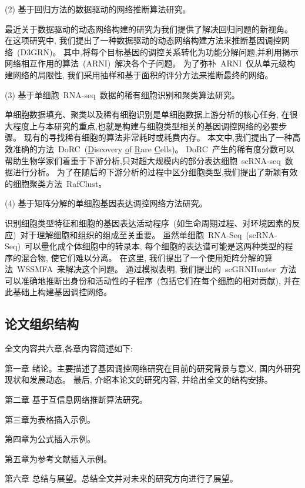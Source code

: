(2) 基于回归方法的数据驱动的网络推断算法研究。

最近关于数据驱动的动态网络构建的研究为我们提供了解决回归问题的新视角。
在这项研究中, 我们提出了一种数据驱动的动态网络构建方法来推断基因调控网络~(D3GRN)。
其中,将每个目标基因的调控关系转化为功能分解问题,并利用揭示网络相互作用的算法~(ARNI)~解决各个子问题。
为了弥补~ARNI~仅从单元级构建网络的局限性,
我们采用抽样和基于面积的评分方法来推断最终的网络。


(3) 基于单细胞~RNA-seq~数据的稀有细胞识别和聚类算法研究。

单细胞数据填充、聚类以及稀有细胞识别是单细胞数据上游分析的核心任务, 
在很大程度上与本研究的重点,也就是构建与细胞类型相关的基因调控网络的必要步骤。
现有的寻找稀有细胞的算法非常耗时或耗费内存。
本文中,我们提出了一种高效准确的方法~DoRC~(\underline{D}iscovery \underline{o}f \underline{R}are \underline{C}ells)。
DoRC~产生的稀有度分数可以帮助生物学家们着重于下游分析,只对超大规模内的部分表达细胞~scRNA-seq~数据进行分析。
为了在随后的下游分析的过程中区分细胞类型,我们提出了新颖有效的细胞聚类方法~RafClust。

(4) 基于矩阵分解的单细胞基因表达调控网络方法研究。

识别细胞类型特征和细胞的基因表达活动程序~(如生命周期过程、对环境因素的反应)~对于理解细胞和组织的组成至关重要。
虽然单细胞~RNA-Seq~(scRNA-Seq)~可以量化成个体细胞中的转录本,
每个细胞的表达谱可能是这两种类型的程序的混合物, 使它们难以分离。
在这里, 我们提出了一个使用矩阵分解的算法~WSSMFA~来解决这个问题。
通过模拟表明, 我们提出的~scGRNHunter~方法可以准确地推断出身份和活动性的子程序~(包括它们在每个细胞的相对贡献), 
并在此基础上构建基因调控网络。

\subsection{论文组织结构}

全文内容共六章,各章内容简述如下:

第一章 绪论。主要描述了基因调控网络研究在目前的研究背景与意义, 国内外研究现状和发展动态。
最后, 介绍本论文的研究内容, 并给出全文的结构安排。

第二章 基于互信息网络推断算法研究。

第三章为表格插入示例。

第四章为公式插入示例。

第五章为参考文献插入示例。

第六章 总结与展望。总结全文并对未来的研究方向进行了展望。


